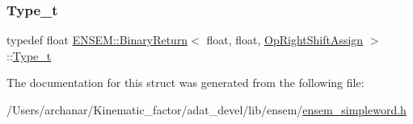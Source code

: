 \mbox{\label{structENSEM_1_1BinaryReturn_3_01float_00_01float_00_01OpRightShiftAssign_01_4_a79bb667fa95c821edd1a65ad18229767}} 
\subsubsection{\texorpdfstring{Type\_t}{Type\_t}\hspace{0.1cm}{\footnotesize\ttfamily [2/2]}}
{\footnotesize\ttfamily typedef float \mbox{\hyperlink{structENSEM_1_1BinaryReturn}{E\+N\+S\+E\+M\+::\+Binary\+Return}}$<$ float, float, \mbox{\hyperlink{structENSEM_1_1OpRightShiftAssign}{Op\+Right\+Shift\+Assign}} $>$\+::\mbox{\hyperlink{structENSEM_1_1BinaryReturn_3_01float_00_01float_00_01OpRightShiftAssign_01_4_a79bb667fa95c821edd1a65ad18229767}{Type\+\_\+t}}}



The documentation for this struct was generated from the following file\+:\begin{DoxyCompactItemize}
\item 
/\+Users/archanar/\+Kinematic\+\_\+factor/adat\+\_\+devel/lib/ensem/\mbox{\hyperlink{lib_2ensem_2ensem__simpleword_8h}{ensem\+\_\+simpleword.\+h}}\end{DoxyCompactItemize}
